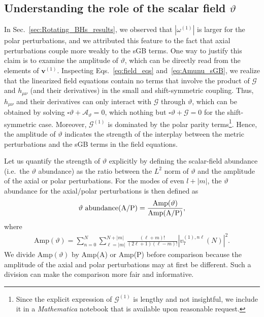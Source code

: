 \documentclass[aps,prx,amsmath,floats,floatfix,twocolumn,
  superscriptaddress,nofootinbib,showpacs]{revtex4-1}
\begin{document}
\subsection{Understanding the role of the scalar field $\vartheta$}
\label{sec:SF_role}

In Sec.~\ref{sec:Rotating_BHs_results}, we observed that  $|\omega^{(1)}|$ is larger for the polar perturbations, and we attributed this feature to the fact that axial perturbations couple more weakly to the sGB terms. 
One way to justify this claim is to examine the amplitude of $\vartheta$, which can be directly read from the elements of $\textbf{v}^{(1)}$. 
Inspecting Eqs.~\eqref{eq:field_eqs} and~\eqref{eq:Amunu_sGB}, we realize that the linearized field equations contain no terms that involve the product of $\mathscr{G}$ and $h_{\mu \nu}$ (and their derivatives) in the small and shift-symmetric coupling.
Thus, $h_{\mu \nu}$ and their derivatives can only interact with $\mathscr{G}$ through $\vartheta$, which can be obtained by solving $\square \vartheta + \mathscr{A}_{\vartheta} = 0$, which nothing but $\square \vartheta + \mathscr{G} = 0$ for the shift-symmetric case. 
Moreover, $\mathscr{G}^{(1)}$ is dominated by the polar parity terms\footnote{Since the explicit expression of $\mathscr{G}^{(1)}$ is lengthy and not insightful, we include it in a \textit{Mathematica} notebook that is available upon reasonable request.}. 
Hence, the amplitude of $\vartheta$ indicates the strength of the interplay between the metric perturbations and the sGB terms in the field equations. 

Let us quantify the strength of $\vartheta$ explicitly by defining the scalar-field abundance (i.e.~the $\vartheta$ abundance) as the ratio between the $L^2$ norm of $\vartheta$ and the amplitude of the axial or polar perturbations. 
For the modes of even $l+|m|$, the $\vartheta$ abundance for the axial/polar perturbations is then defined as 
\begin{equation}\label{eq:SFA}
\begin{split}
& \vartheta~\text{abundance(A/P)} = \frac{\text{Amp}(\vartheta)}{\rm Amp(A/P)}, \\ 
\end{split}
\end{equation}
where 
\begin{equation}
\begin{split}
\text{Amp}(\vartheta) = \sum_{n=0}^{N} \sum_{\ell = |m|}^{N+|m|} \frac{(\ell+m)!}{(2\ell+1)(\ell-m)!} |v_7^{(1), n \ell}(N)|^2. 
\end{split}
\end{equation}
We divide $\text{Amp}(\vartheta)$ by Amp(A) or Amp(P) before comparison because the amplitude of the axial and polar perturbations may at first be different. 
Such a division can make the comparison more fair and informative. 
\end{document}
